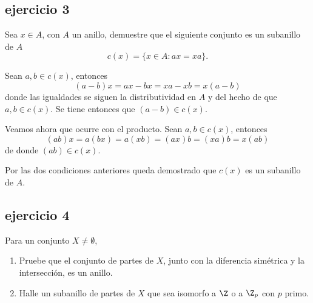 \subsection*{ejercicio 3}
	Sea $x \in A$, con $A$ un anillo, demuestre que el siguiente conjunto es un subanillo de $A$ \[ c(x) = \{x \in A: ax = xa \}. \]
\begin{sol}
	Sean $a,b \in c(x)$, entonces
	\[ (a-b)x = ax-bx = xa-xb = x(a-b) \]
	donde las igualdades se siguen la distributividad en $A$ y del hecho de que $a,b \in c(x)$. Se tiene entonces que $(a-b) \in c(x)$. 
	
	Veamos ahora que ocurre con el producto. Sean $a,b \in c(x)$, entonces 
	\[ (ab)x = a(bx) = a(xb) = (ax)b = (xa)b = x(ab) \]
	de donde $(ab) \in c(x)$. 
	
	Por las dos condiciones anteriores queda demostrado que $c(x)$ es un subanillo de $A$.
\end{sol}

\subsection*{ejercicio 4}
	Para un conjunto $X \neq \emptyset$,  
\begin{enumerate}
	\item Pruebe que el conjunto de partes de $X$, junto con la diferencia simé\-trica y la intersección, es un anillo.
	\item Halle un subanillo de partes de $X$ que sea isomorfo a $\Z$ o a $\Z_p$ con $p$ primo.
\end{enumerate}
	

